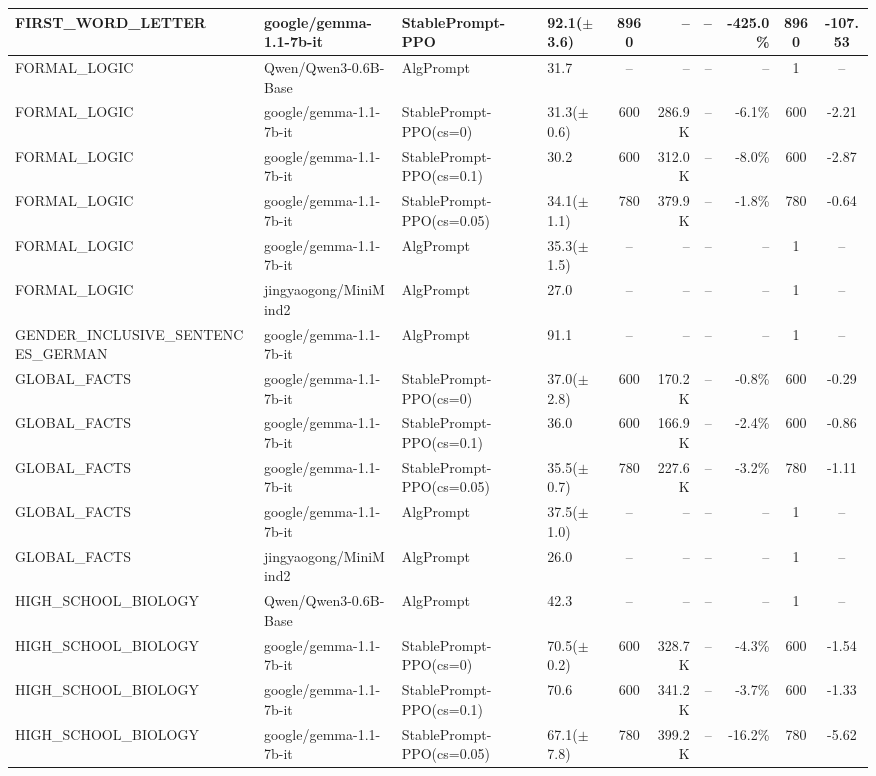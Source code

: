 {\begin{longtable}{@{}p{5.5cm}p{4.5cm}p{2.5cm}lcrrrcc@{}}
FIRST\_WORD\_LETTER & google/gemma-1.1-7b-it & StablePrompt-PPO & 92.1($\pm$3.6) & 8960 & -- & -- & -425.0\% & 8960 & -107.53 \\
\midrule
FORMAL\_LOGIC & Qwen/Qwen3-0.6B-Base & AlgPrompt & 31.7 & -- & -- & -- & -- & 1 & -- \\
\midrule
FORMAL\_LOGIC & google/gemma-1.1-7b-it & StablePrompt-PPO(cs=0) & 31.3($\pm$0.6) & 600 & 286.9K & -- & -6.1\% & 600 & -2.21 \\
FORMAL\_LOGIC & google/gemma-1.1-7b-it & StablePrompt-PPO(cs=0.1) & 30.2 & 600 & 312.0K & -- & -8.0\% & 600 & -2.87 \\
FORMAL\_LOGIC & google/gemma-1.1-7b-it & StablePrompt-PPO(cs=0.05) & 34.1($\pm$1.1) & 780 & 379.9K & -- & -1.8\% & 780 & -0.64 \\
FORMAL\_LOGIC & google/gemma-1.1-7b-it & AlgPrompt & 35.3($\pm$1.5) & -- & -- & -- & -- & 1 & -- \\
\midrule
FORMAL\_LOGIC & jingyaogong/MiniMind2 & AlgPrompt & 27.0 & -- & -- & -- & -- & 1 & -- \\
\midrule
GENDER\_INCLUSIVE\_SENTENCES\_GERMAN & google/gemma-1.1-7b-it & AlgPrompt & 91.1 & -- & -- & -- & -- & 1 & -- \\
\midrule
GLOBAL\_FACTS & google/gemma-1.1-7b-it & StablePrompt-PPO(cs=0) & 37.0($\pm$2.8) & 600 & 170.2K & -- & -0.8\% & 600 & -0.29 \\
GLOBAL\_FACTS & google/gemma-1.1-7b-it & StablePrompt-PPO(cs=0.1) & 36.0 & 600 & 166.9K & -- & -2.4\% & 600 & -0.86 \\
GLOBAL\_FACTS & google/gemma-1.1-7b-it & StablePrompt-PPO(cs=0.05) & 35.5($\pm$0.7) & 780 & 227.6K & -- & -3.2\% & 780 & -1.11 \\
GLOBAL\_FACTS & google/gemma-1.1-7b-it & AlgPrompt & 37.5($\pm$1.0) & -- & -- & -- & -- & 1 & -- \\
\midrule
GLOBAL\_FACTS & jingyaogong/MiniMind2 & AlgPrompt & 26.0 & -- & -- & -- & -- & 1 & -- \\
\midrule
HIGH\_SCHOOL\_BIOLOGY & Qwen/Qwen3-0.6B-Base & AlgPrompt & 42.3 & -- & -- & -- & -- & 1 & -- \\
\midrule
HIGH\_SCHOOL\_BIOLOGY & google/gemma-1.1-7b-it & StablePrompt-PPO(cs=0) & 70.5($\pm$0.2) & 600 & 328.7K & -- & -4.3\% & 600 & -1.54 \\
HIGH\_SCHOOL\_BIOLOGY & google/gemma-1.1-7b-it & StablePrompt-PPO(cs=0.1) & 70.6 & 600 & 341.2K & -- & -3.7\% & 600 & -1.33 \\
HIGH\_SCHOOL\_BIOLOGY & google/gemma-1.1-7b-it & StablePrompt-PPO(cs=0.05) & 67.1($\pm$7.8) & 780 & 399.2K & -- & -16.2\% & 780 & -5.62 \\

\end{longtable}}
